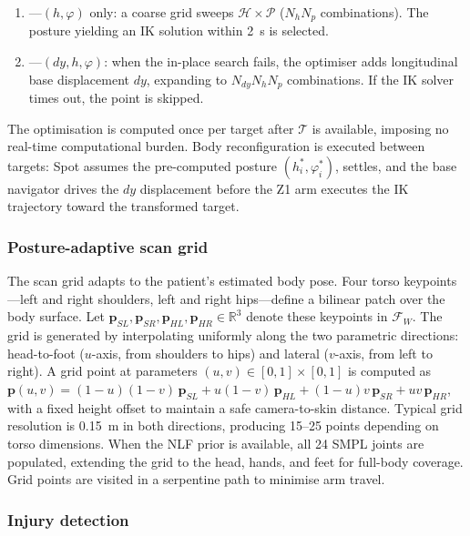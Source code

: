 \begin{enumerate}
  \item \textbf{}---$(h, \varphi)$ only: a
        coarse grid sweeps $\mathcal{H} \times \mathcal{P}$ ($N_h N_p$
        combinations). The posture yielding an \ac{IK} solution within
        \SI{2}{\second} is selected.
  \item \textbf{}---$(dy, h,
        \varphi)$: when the in-place search fails, the optimiser adds
        longitudinal base displacement $dy$, expanding to $N_{dy} N_h N_p$
        combinations. If the \ac{IK} solver times out, the point is skipped.
\end{enumerate}

The optimisation is computed once per target after $\mathcal{T}$ is available,
imposing no real-time computational burden.  Body reconfiguration is executed
between targets: Spot assumes the pre-computed posture $(h_i^*, \varphi_i^*)$,
settles, and the base navigator drives the $dy$ displacement before the Z1 arm
executes the \ac{IK} trajectory toward the transformed target.

\subsubsection{Posture-adaptive scan grid}

The scan grid adapts to the patient's estimated body pose. Four torso
keypoints---left and right shoulders, left and right hips---define a bilinear
patch over the body surface.  Let $\mathbf{p}_{SL}, \mathbf{p}_{SR},
\mathbf{p}_{HL}, \mathbf{p}_{HR} \in \mathbb{R}^3$ denote these keypoints in
$\mathcal{F}_W$.  The grid is generated by interpolating uniformly along the
two parametric directions: head-to-foot ($u$-axis, from shoulders to hips) and
lateral ($v$-axis, from left to right).  A grid point at parameters
$(u, v) \in [0,1] \times [0,1]$ is computed as
$\mathbf{p}(u,v) = (1{-}u)(1{-}v)\,\mathbf{p}_{SL} + u(1{-}v)\,\mathbf{p}_{HL}
+ (1{-}u)v\,\mathbf{p}_{SR} + uv\,\mathbf{p}_{HR}$, with a fixed height offset
to maintain a safe camera-to-skin distance.  Typical grid resolution is
\SI{0.15}{\metre} in both directions, producing 15--25 points depending on
torso dimensions.  When the NLF prior is available, all 24 \ac{SMPL} joints
are populated, extending the grid to the head, hands, and feet for full-body
coverage.  Grid points are visited in a serpentine path to minimise arm
travel.

\subsubsection{Injury detection}

